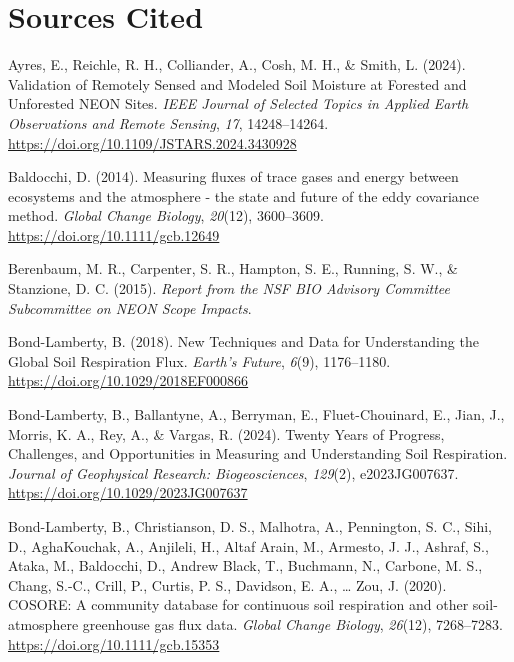 \documentclass[
  letterpaper,
  DIV=11,
  numbers=noendperiod]{scrartcl}
\newlength{\cslhangindent}
\newenvironment{CSLReferences}[2] %
 {\begin{list}{}{%
  \setlength{\itemindent}{0pt}
  \setlength{\leftmargin}{0pt}
  \setlength{\parsep}{0pt}
  \ifodd #1
   \setlength{\leftmargin}{\cslhangindent}
   \setlength{\itemindent}{-1\cslhangindent}
  \fi
  \setlength{\itemsep}{#2\baselineskip}}}
 {\end{list}}
\begin{document}
\section*{Sources Cited}\label{sources-cited}

\label{refs}
\begin{CSLReferences}{1}{0}
Ayres, E., Reichle, R. H., Colliander, A., Cosh, M. H., \& Smith, L.
(2024). Validation of {Remotely Sensed} and {Modeled Soil Moisture} at
{Forested} and {Unforested NEON Sites}. \emph{IEEE Journal of Selected
Topics in Applied Earth Observations and Remote Sensing}, \emph{17},
14248--14264. \url{https://doi.org/10.1109/JSTARS.2024.3430928}

Baldocchi, D. (2014). Measuring fluxes of trace gases and energy between
ecosystems and the atmosphere - the state and future of the eddy
covariance method. \emph{Global Change Biology}, \emph{20}(12),
3600--3609. \url{https://doi.org/10.1111/gcb.12649}

Berenbaum, M. R., Carpenter, S. R., Hampton, S. E., Running, S. W., \&
Stanzione, D. C. (2015). \emph{Report from the {NSF BIO Advisory
Committee Subcommittee} on {NEON Scope Impacts}}.

Bond-Lamberty, B. (2018). New {Techniques} and {Data} for
{Understanding} the {Global Soil Respiration Flux}. \emph{Earth's
Future}, \emph{6}(9), 1176--1180.
\url{https://doi.org/10.1029/2018EF000866}

Bond-Lamberty, B., Ballantyne, A., Berryman, E., Fluet-Chouinard, E.,
Jian, J., Morris, K. A., Rey, A., \& Vargas, R. (2024). Twenty {Years}
of {Progress}, {Challenges}, and {Opportunities} in {Measuring} and
{Understanding Soil Respiration}. \emph{Journal of Geophysical Research:
Biogeosciences}, \emph{129}(2), e2023JG007637.
\url{https://doi.org/10.1029/2023JG007637}

Bond-Lamberty, B., Christianson, D. S., Malhotra, A., Pennington, S. C.,
Sihi, D., AghaKouchak, A., Anjileli, H., Altaf Arain, M., Armesto, J.
J., Ashraf, S., Ataka, M., Baldocchi, D., Andrew Black, T., Buchmann,
N., Carbone, M. S., Chang, S.-C., Crill, P., Curtis, P. S., Davidson, E.
A., \ldots{} Zou, J. (2020). {COSORE}: {A} community database for
continuous soil respiration and other soil-atmosphere greenhouse gas
flux data. \emph{Global Change Biology}, \emph{26}(12), 7268--7283.
\url{https://doi.org/10.1111/gcb.15353}


\end{CSLReferences}
\end{document}
